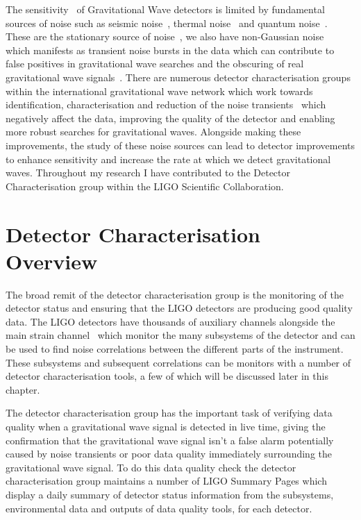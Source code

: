 


The sensitivity~\cite{aLIGO_design_curve:2018} of Gravitational Wave detectors is limited by fundamental sources of noise such as seismic noise~\cite{Glanzer:2023}, thermal noise~\cite{thermal_noise:2018} and quantum noise~\cite{quantum_noise:2003}. These are the stationary source of noise~\cite{PSD_var:2020}, we also have non-Gaussian noise~\cite{Noise_Guide:2020} which manifests as transient noise bursts in the data which can contribute to false positives in gravitational wave searches and the obscuring of real gravitational wave signals~\cite{GW170817:2017, GW150914_noise:2016}. There are numerous detector characterisation groups~\cite{O2O3_DetChar:2021, VirgoDetChar:2023} within the international gravitational wave network which work towards identification, characterisation and reduction of the noise transients~\cite{ArchEnemy:2023, Glanzer:2023, gravityspy:2017, gravityspy:2021, gravityspy:2023, glitschen:2021, Nuttall:2018, reducing_scattering:2020, BayesWave:2015, gwadaptive:2022, O3_subtraction:2022, Powell:2016} which negatively affect the data, improving the quality of the detector and enabling more robust searches for gravitational waves. Alongside making these improvements, the study of these noise sources can lead to detector improvements to enhance sensitivity and increase the rate at which we detect gravitational waves. Throughout my research I have contributed to the Detector Characterisation group within the LIGO Scientific Collaboration.

\section{Detector Characterisation Overview}

The broad remit of the detector characterisation group is the monitoring of the detector status and ensuring that the LIGO detectors are producing good quality data. The LIGO detectors have thousands of auxiliary channels alongside the main strain channel~\cite{iDQ:2020} which monitor the many subsystems of the detector and can be used to find noise correlations between the different parts of the instrument. These subsystems and subsequent correlations can be monitors with a number of detector characterisation tools, a few of which will be discussed later in this chapter.

The detector characterisation group has the important task of verifying data quality when a gravitational wave signal is detected in live time, giving the confirmation that the gravitational wave signal isn't a false alarm potentially caused by noise transients or poor data quality immediately surrounding the gravitational wave signal. To do this data quality check the detector characterisation group maintains a number of LIGO Summary Pages which display a daily summary of detector status information from the subsystems, environmental data and outputs of data quality tools, for each detector.

